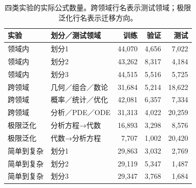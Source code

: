\begin{table}[t]\centering\small\caption{四类实验的实际公式数量。跨领域行名表示测试领域；极限泛化行名表示迁移方向。}\label{tab:splits}\begin{tabular}{llrrr}\toprule 实验&划分／测试领域&训练&验证&测试\\\midrule
领域内 & 划分1 & 44,070 & 4,656 & 7,022\\
领域内 & 划分2 & 43,262 & 8,317 & 4,184\\
领域内 & 划分3 & 44,515 & 5,516 & 5,725\\
\addlinespace
跨领域 & 几何／组合／数论 & 31,684 & 5,214 & 18,622\\
跨领域 & 概率／统计／优化 & 42,081 & 6,357 & 7,334\\
跨领域 & 分析／PDE／ODE & 31,313 & 4,022 & 20,259\\
\addlinespace
极限泛化 & 分析方程→代数 & 16,893 & 3,298 & 8,576\\
极限泛化 & 代数→分析方程 & 7,707 & 1,002 & 20,420\\
\addlinespace
简单到复杂 & 划分1 & 29,863 & 3,032 & 2,769\\
简单到复杂 & 划分2 & 29,119 & 5,347 & 1,487\\
简单到复杂 & 划分3 & 29,347 & 3,768 & 1,684\\
\bottomrule\end{tabular}\end{table}
